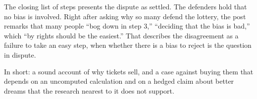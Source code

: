 \begin{afterword}
The closing list of steps presents the dispute as settled. The defenders hold that no bias is involved. Right after asking why so many defend the lottery, the post remarks that many people ``bog down in step 3,'' ``deciding that the bias is bad,'' which ``by rights should be the easiest.'' That describes the disagreement as a failure to take an easy step, when whether there is a bias to reject is the question in dispute.

In short: a sound account of why tickets sell, and a case against buying them that depends on an uncomputed calculation and on a hedged claim about better dreams that the research nearest to it does not support.
\end{afterword}
